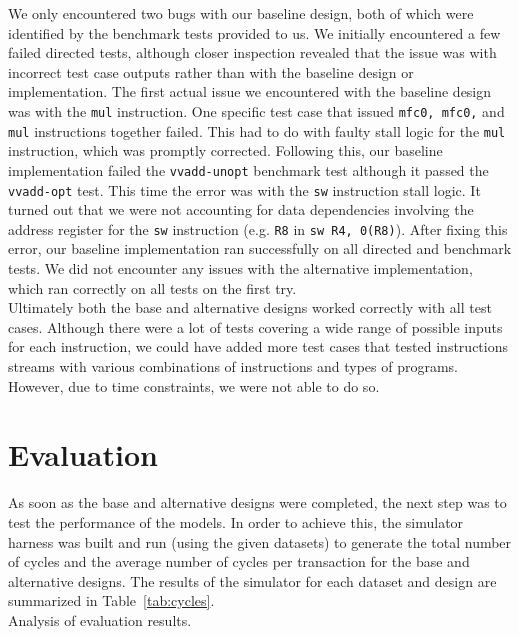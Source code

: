 \documentclass[10pt]{article}
\begin{document}
We only encountered two bugs with our baseline design, both of which were identified by the benchmark tests provided to us. We initially encountered a few failed directed tests, although closer inspection revealed that the issue was with incorrect test case outputs rather than with the baseline design or implementation. The first actual issue we encountered with the baseline design was with the \texttt{mul} instruction. One specific test case that issued \texttt{mfc0, mfc0,} and \texttt{mul} instructions together failed. This had to do with faulty stall logic for the \texttt{mul} instruction, which was promptly corrected. Following this, our baseline implementation failed the \texttt{vvadd-unopt} benchmark test although it passed the \texttt{vvadd-opt} test. This time the error was with the \texttt{sw} instruction stall logic. It turned out that we were not accounting for data dependencies involving the address register for the \texttt{sw} instruction (e.g. \texttt{R8} in \texttt{sw R4, 0(R8)}). After fixing this error, our baseline implementation ran successfully on all directed and benchmark tests. We did not encounter any issues with the alternative implementation, which ran correctly on all tests on the first try. \\ 

Ultimately both the base and alternative designs worked correctly with all test cases. Although there were a lot of tests covering a wide range of possible inputs for each instruction, we could have added more test cases that tested instructions streams with various combinations of instructions and types of programs. However, due to time constraints, we were not able to do so. \\


\section{Evaluation}

As soon as the base and alternative designs were completed, the next step was to test the performance of the models. In order to achieve this, the simulator harness was built and run (using the given datasets) to generate the total number of cycles and the average number of cycles per transaction for the base and alternative designs. The results of the simulator for each dataset and design are summarized in Table~\ref{tab:cycles}. \\

Analysis of evaluation results. \\
\end{document}

